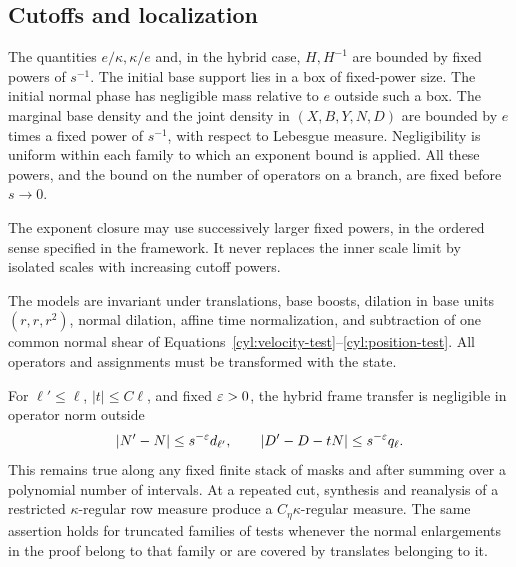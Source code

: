 \subsection{Cutoffs and localization}

\begin{definition}\label{cyl:def-setup}
The quantities $e/\kappa,\kappa/e$ and, in the hybrid case, $H,H^{-1}$
are bounded by fixed powers of $s^{-1}$.  The initial base support lies in
a box of fixed-power size.  The initial normal phase has negligible mass
relative to $e$ outside such a box.  The marginal base density and the
joint density in $(X,B,Y,N,D)$ are bounded by $e$ times a fixed power of
$s^{-1}$, with respect to Lebesgue measure.  Negligibility is uniform
within each family to which an exponent bound is applied.  All these
powers, and the bound on the number of operators on a branch, are fixed
before $s\to0$.
\end{definition}

The exponent closure may use successively larger fixed powers, in the
ordered sense specified in the framework.  It never replaces the inner
scale limit by isolated scales with increasing cutoff powers.

\begin{lemma}\label{cyl:localization}
The models are invariant under translations, base boosts, dilation in
base units $(r,r,r^2)$, normal dilation, affine time normalization, and
subtraction of one common normal shear of
Equations~\eqref{cyl:velocity-test}--\eqref{cyl:position-test}.  All
operators and assignments must be transformed with the state.

For $\ell'\le\ell$, $|t|\le C\ell$, and fixed $\varepsilon>0$, the hybrid
frame transfer is negligible in operator norm outside
\begin{equation}\label{cyl:correspondence}
 |N'-N|\le s^{-\varepsilon}d_{\ell'},\qquad
 |D'-D-tN|\le s^{-\varepsilon}q_\ell.
\end{equation}
This remains true along any fixed finite stack of masks and after summing
over a polynomial number of intervals.  At a repeated cut, synthesis and
reanalysis of a restricted $\kappa$-regular row measure produce a
$C_\eta\kappa$-regular measure.  The same assertion holds for truncated
families of tests whenever the normal enlargements in the proof belong
to that family or are covered by translates belonging to it.
\end{lemma}

